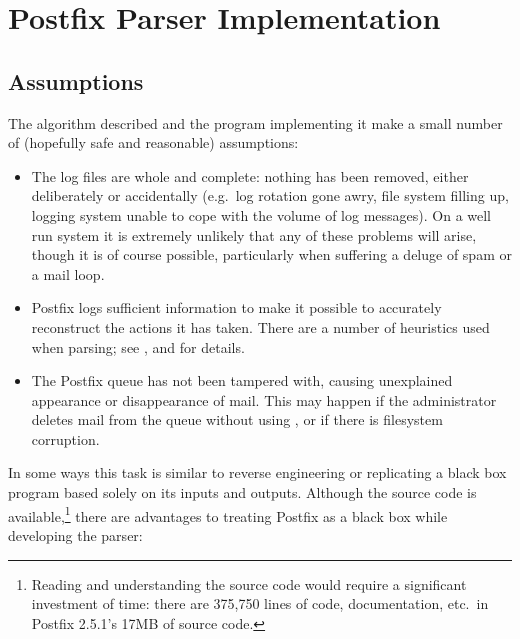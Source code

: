 \newpage
\section{Postfix Parser Implementation}

\subsection{Assumptions}

The algorithm described and the program implementing it make a small number
of (hopefully safe and reasonable) assumptions:

\begin{itemize}

    \item The log files are whole and complete: nothing has been removed,
        either deliberately or accidentally (e.g.\ log rotation gone awry,
        file system filling up, logging system unable to cope with the
        volume of log messages).  On a well run system it is extremely
        unlikely that any of these problems will arise, though it is of
        course possible, particularly when suffering a deluge of spam or a
        mail loop.

    \item Postfix logs sufficient information to make it possible to
        accurately reconstruct the actions it has taken.  There are a
        number of heuristics used when parsing; see
        ,
         and  for details.

    \item The Postfix queue has not been tampered with, causing unexplained
        appearance or disappearance of mail.  This may happen if the
        administrator deletes mail from the queue without using
        , or if there is filesystem corruption.

\end{itemize}

In some ways this task is similar to reverse engineering or replicating a
black box program based solely on its inputs and outputs.  Although the
source code is available,\footnote{Reading and understanding the source
code would require a significant investment of time: there are 375,750
lines of code, documentation, etc.\ in Postfix 2.5.1's 17MB of source
code.} there are advantages to treating Postfix as a black box while
developing the parser:

